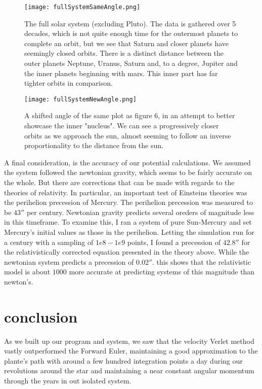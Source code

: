 \documentclass[10pt, twocolumn]{revtex4-1}
\begin{document}
\begin{figure}[hbtp]
    \texttt{[image: fullSystemSameAngle.png]}
    \caption{The full solar system (excluding Pluto). The data is gathered over 5 decades, which is not quite enough 
        time for the outermost planets to complete an orbit, but we see that Saturn and closer planets have seemingly 
        closed orbits. There is a distinct distance between the outer planets Neptune, Uranus, Saturn and, to a degree, 
        Jupiter and the inner planets beginning with mars. This inner part has far tighter orbits in comparison.} 
    \label{}
\end{figure}


\begin{figure}[hbtp]
    \texttt{[image: fullSystemNewAngle.png]}
    \caption{A shifted angle of the same plot as figure 6, in an attempt to better showcase the inner "nucleus". 
        We can see a progressively closer orbits as we approach the sun, almost seeming to follow an inverse proportionality 
        to the distance from the sun. } 
    \label{}
\end{figure}

A final consideration, is the accuracy of our potential calculations. We assumed the system followed the newtonian gravity, which seems 
to be fairly accurate on the whole. But there are corrections that can be made with regards to the theories of relativity. In particular, 
an important test of Einsteins theories was the perihelion precession of Mercury. The perihelion precession was measured to be $43''$ per century.
Newtonian gravity predicts several oreders of magnitude less in this timeframe. To examine this, I ran a system of pure Sun-Mercury and set Mercury's 
initial values as those in the perihelion. Letting the simulation run for a century with a sampling of $1e8-1e9$ points, I found a precession of 
$42.8''$ for the relativistically corrected equation presented in the theory above. While the newtonian system predicts a precession of $0.02''$.
this shows that the relativistic model is about $1 000$ more accurate at predicting systems of this magnitude than newton's. 

\section{conclusion}
As we built up our program and system, we saw that the velocity Verlet method vastly outperformed the Forward Euler, maintaining a good approximation
to the plante's path with around a few hundred integration points a day during our revolutions around the star and maintaining a near constant angular
momentum through the years in out isolated system. \\
\end{document}
